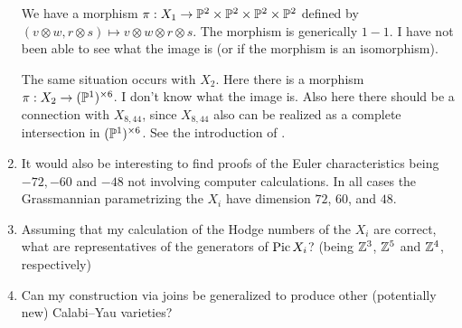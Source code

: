 \begin{enumerate}
	We have a morphism $\pi:X_1 \to \P^2 \times \P^2 \times \P^2 \times \P^2$ defined by $(v \otimes w, r \otimes s) \mapsto v \otimes w \otimes r \otimes s$. The morphism is generically $1-1$. I have not been able to see what the image is (or if the morphism is an isomorphism).

	The same situation occurs with $X_2$. Here there is a morphism ${\pi:X_2 \to (\P^1)^{\times 6}}$. I don't know what the image is. Also here there should be a connection with $X_{8,44}$, since $X_{8,44}$ also can be realized as a complete intersection in $(\P^1)^{\times 6}$. See the introduction of \cite{braun_smallhodgenumbers}.

	\item It would also be interesting to find proofs of the Euler characteristics being $-72,-60$ and $-48$ not involving computer calculations. In all cases the Grassmannian parametrizing the $X_i$ have dimension $72$, $60$, and $48$. 

	\item Assuming that my calculation of the Hodge numbers of the $X_i$ are correct, what are representatives of the generators of $\Pic X_i$? (being $\Z^3$, $\Z^5$ and $\Z^4$, respectively)

	\item Can my construction via joins be generalized to produce other (potentially new) Calabi--Yau varieties?
\end{enumerate}